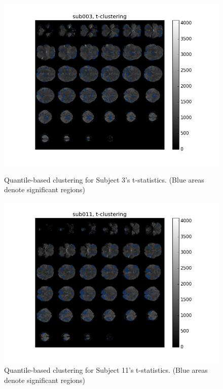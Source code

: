 \begin{figure}[H]
\centering
\begin{minipage}[b]{.66\linewidth}
	\centering
	\includegraphics[width=.8\linewidth]{../images/sub003_t_overlay.png} 
	\caption{Quantile-based clustering for Subject 3's t-statistics. 
	(Blue areas denote significant regions)}
	\label{fig:clustersub3}
\end{minipage}	

\begin{minipage}[b]{.66\linewidth}
	\centering
		\includegraphics[width=.8\linewidth]{../images/sub011_t_overlay.png} 
	\caption{Quantile-based clustering for Subject 11's t-statistics. 
	(Blue areas denote significant regions)}
	\label{fig:clustersub11}
\end{minipage}


\end{figure}

